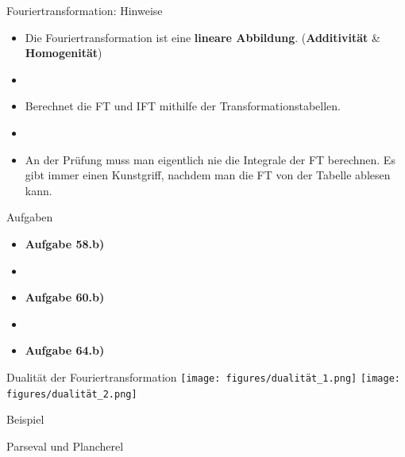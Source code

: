 \documentclass[14pt, aspectratio=169, handout]{beamer}
\begin{document}
\begin{frame}{Fouriertransformation: Hinweise}
    \begin{itemize}
        \item Die Fouriertransformation ist eine \textbf{lineare Abbildung}. (\textbf{Additivität} \& \textbf{Homogenität})
        \item[] 
        \item \alert{Berechnet die FT und IFT mithilfe der Transformationstabellen.}
        \item[] 
        \item An der Prüfung muss man eigentlich nie die Integrale der FT berechnen. Es gibt immer einen Kunstgriff, nachdem man die FT von der Tabelle ablesen kann.
    \end{itemize}
\end{frame}

\begin{frame}{Aufgaben}
    \begin{itemize}
        \item \textbf{Aufgabe 58.b)}
        \item[] 
        \item \textbf{Aufgabe 60.b)}
        \item[] 
        \item \textbf{Aufgabe 64.b)}
    \end{itemize}
\end{frame}

\begin{frame}{Dualität der Fouriertransformation}
    \texttt{[image: figures/dualität\_1.png]}
    \texttt{[image: figures/dualität\_2.png]}
\end{frame}

\begin{frame}{Beispiel}
    
\end{frame}

\begin{frame}{Parseval und Plancherel}
\end{frame}
\end{document}
